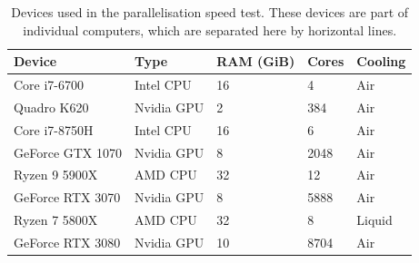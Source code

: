 \documentclass{jors}
\begin{document}
		\begin{table}[h!]
			\caption{Devices used in the parallelisation speed test. These devices are part of individual computers, which are separated here by horizontal lines.}
			\label{tab:devices}
			\begin{tabular}{l|l|l|l|l}
				\textbf{Device}	&\textbf{Type}	&\textbf{RAM (GiB)}	&\textbf{Cores}	&\textbf{Cooling}\\
				\hline
				Core i7-6700	&Intel CPU		&16					&4				&Air\\
				Quadro K620		&Nvidia GPU		&2					&384			&Air\\
				\hline
				Core i7-8750H	&Intel CPU		&16					&6				&Air\\
				GeForce GTX 1070&Nvidia GPU		&8					&2048			&Air\\
				\hline
				Ryzen 9 5900X	&AMD CPU		&32					&12				&Air\\
				GeForce RTX 3070&Nvidia GPU		&8					&5888			&Air\\
				\hline
				Ryzen 7 5800X	&AMD CPU		&32					&8				&Liquid\\
				GeForce RTX 3080&Nvidia GPU		&10					&8704			&Air\\
			\end{tabular}
		\end{table}
\end{document}
